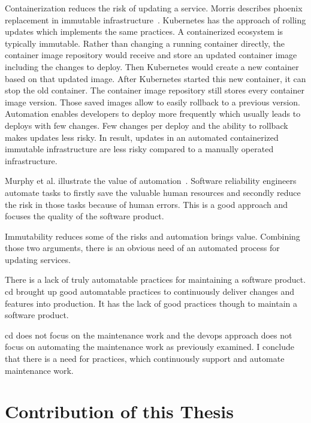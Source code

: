 Containerization reduces the risk of updating a service. Morris describes phoenix
replacement in immutable infrastructure~\cite{infra_as_code_phoenix}. Kubernetes has the
approach of rolling updates which implements the same practices. A containerized ecosystem
is typically immutable. Rather than changing a running container directly, the container
image repository would receive and store an updated container image including the changes
to deploy. Then Kubernetes would create a new container based on that updated image. After
Kubernetes started this new container, it can stop the old container. The container image
repository still stores every container image version. Those saved images allow to easily
rollback to a previous version. Automation enables developers to deploy more frequently
which usually leads to deploys with few changes. Few changes per deploy and the ability to
rollback makes updates less risky. In result, updates in an automated containerized
immutable infrastructure are less risky compared to a manually operated infrastructure.

Murphy et al. illustrate the value of automation~\cite{sre_automation}. Software
reliability engineers automate tasks to firstly save the valuable human resources and
secondly reduce the risk in those tasks because of human errors. This is a good approach
and focuses the quality of the software product.

Immutability reduces some of the risks and automation brings value. Combining those two
arguments, there is an obvious need of an automated process for updating services.

There is a lack of truly automatable practices for maintaining a software
product. \gls{cd} brought up good automatable practices to continuously deliver changes
and features into production. It has the lack of good practices though to maintain a
software product.

\gls{cd} does not focus on the maintenance work and the devops approach does not focus on
automating the maintenance work as previously examined. I conclude that there is a need
for practices, which continuously support and automate maintenance work.

\section{Contribution of this Thesis}


